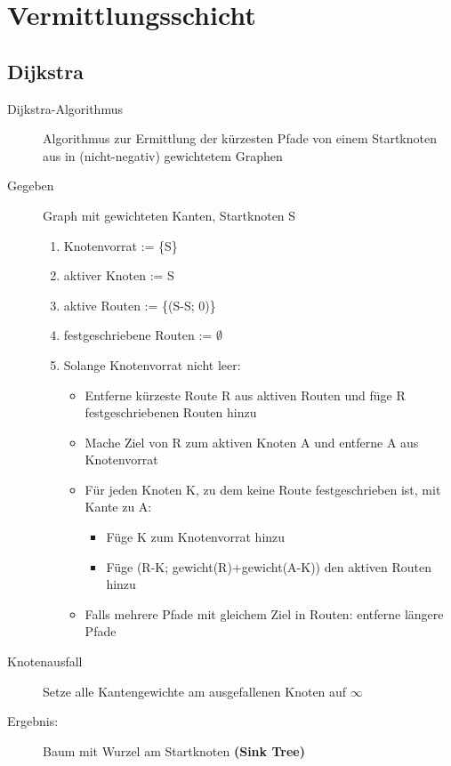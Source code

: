 \documentclass[a4paper]{article}
\begin{document}
\section{Vermittlungsschicht}
\subsection{Dijkstra}
\begin{samepage}
\begin{description}
    \item[Dijkstra-Algorithmus] Algorithmus zur Ermittlung der kürzesten Pfade von einem Startknoten aus in (nicht-negativ) gewichtetem Graphen
    \item[Gegeben] Graph mit gewichteten Kanten, Startknoten S
    \begin{enumerate}
        \item Knotenvorrat := \{S\}
        \item aktiver Knoten := S
        \item aktive Routen := \{(S-S; 0)\}
        \item festgeschriebene Routen := $\emptyset$
        \item Solange Knotenvorrat nicht leer:
        \begin{itemize}
            \item Entferne kürzeste Route R aus aktiven Routen und füge R festgeschriebenen Routen hinzu
            \item Mache Ziel von R zum aktiven Knoten A und entferne A aus Knotenvorrat
            \item Für jeden Knoten K, zu dem keine Route festgeschrieben ist, mit Kante zu A:
            \begin{itemize}
                \item Füge K zum Knotenvorrat hinzu
                \item Füge (R-K; gewicht(R)$+$gewicht(A-K)) den aktiven Routen hinzu
            \end{itemize}
            \item Falls mehrere Pfade mit gleichem Ziel in Routen: entferne längere Pfade
        \end{itemize}
    \end{enumerate}
    \item[Knotenausfall] Setze alle Kantengewichte am ausgefallenen Knoten auf $\infty$
    \item[Ergebnis:] Baum mit Wurzel am Startknoten \textbf{(Sink Tree)}
\end{description}
\end{samepage}
\end{document}
